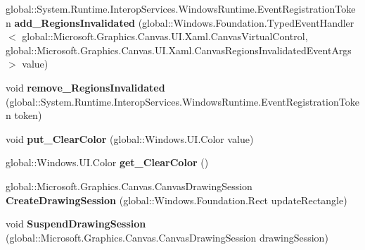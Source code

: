 \begin{DoxyCompactItemize}
global\+::\+System.\+Runtime.\+Interop\+Services.\+Windows\+Runtime.\+Event\+Registration\+Token {\bfseries add\+\_\+\+Regions\+Invalidated} (global\+::\+Windows.\+Foundation.\+Typed\+Event\+Handler$<$ global\+::\+Microsoft.\+Graphics.\+Canvas.\+U\+I.\+Xaml.\+Canvas\+Virtual\+Control, global\+::\+Microsoft.\+Graphics.\+Canvas.\+U\+I.\+Xaml.\+Canvas\+Regions\+Invalidated\+Event\+Args $>$ value)
\item 
\mbox{\label{class_microsoft_1_1_graphics_1_1_canvas_1_1_u_i_1_1_xaml_1_1_canvas_virtual_control_a6ca7dfb4d3d175d3b2a55029b1f0f300}} 
void {\bfseries remove\+\_\+\+Regions\+Invalidated} (global\+::\+System.\+Runtime.\+Interop\+Services.\+Windows\+Runtime.\+Event\+Registration\+Token token)
\item 
\mbox{\label{class_microsoft_1_1_graphics_1_1_canvas_1_1_u_i_1_1_xaml_1_1_canvas_virtual_control_af130409d50f1c44d00f3db3c4c54e318}} 
void {\bfseries put\+\_\+\+Clear\+Color} (global\+::\+Windows.\+U\+I.\+Color value)
\item 
\mbox{\label{class_microsoft_1_1_graphics_1_1_canvas_1_1_u_i_1_1_xaml_1_1_canvas_virtual_control_ad85b4cdd55249b068fd5faca1d6a7339}} 
global\+::\+Windows.\+U\+I.\+Color {\bfseries get\+\_\+\+Clear\+Color} ()
\item 
\mbox{\label{class_microsoft_1_1_graphics_1_1_canvas_1_1_u_i_1_1_xaml_1_1_canvas_virtual_control_afd788b24472d49a5bfc528818f1b2897}} 
global\+::\+Microsoft.\+Graphics.\+Canvas.\+Canvas\+Drawing\+Session {\bfseries Create\+Drawing\+Session} (global\+::\+Windows.\+Foundation.\+Rect update\+Rectangle)
\item 
\mbox{\label{class_microsoft_1_1_graphics_1_1_canvas_1_1_u_i_1_1_xaml_1_1_canvas_virtual_control_a67b34bbbcf4601ef850f26c26a0c3f54}} 
void {\bfseries Suspend\+Drawing\+Session} (global\+::\+Microsoft.\+Graphics.\+Canvas.\+Canvas\+Drawing\+Session drawing\+Session)
\item 

\end{DoxyCompactItemize}
